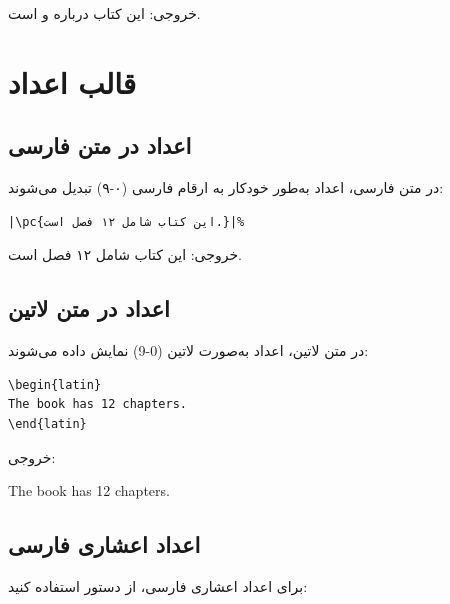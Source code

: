 خروجی: این کتاب درباره 
و  است.


\section{قالب اعداد}
\label{sec:localization-numbers}

\subsection{اعداد در متن فارسی}
\label{sec:localization-numbers-fa}

در متن فارسی، اعداد به‌طور خودکار به ارقام
فارسی (۰-۹) تبدیل می‌شوند:

\begin{latin}
\begin{verbatim}
|\pc{این کتاب شامل ۱۲ فصل است.}|%
\end{verbatim}
\end{latin}

خروجی: این کتاب شامل ۱۲ فصل است.

\subsection{اعداد در متن لاتین}
\label{sec:localization-numbers-latin}

در متن لاتین، اعداد به‌صورت لاتین (0-9)
نمایش داده می‌شوند:

\begin{latin}
\begin{verbatim}
\begin{latin}
The book has 12 chapters.
\end{latin}
\end{verbatim}
\end{latin}

خروجی:

\begin{latin}
The book has 12 chapters.
\end{latin}

\subsection{اعداد اعشاری فارسی}
\label{sec:localization-numbers-decimal}

برای اعداد اعشاری فارسی، از دستور 
استفاده کنید:


